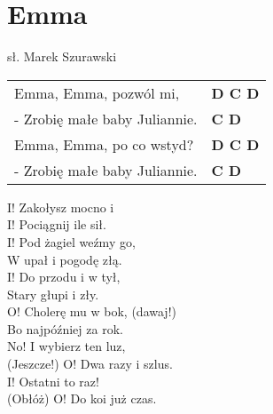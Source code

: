 \section{Emma}

sł. Marek Szurawski

\vspace{2em}
\begin{tabular}{@{}p{7cm}@{}l@{}}
Emma, Emma, pozwól mi, & \bfseries D C D\\
- Zrobię małe baby Juliannie. & \bfseries C D\\
Emma, Emma, po co wstyd? & \bfseries D C D\\
- Zrobię małe baby Juliannie. & \bfseries C D\\
\end{tabular}

\vspace{1em}
I! Zakołysz mocno i \\
I! Pociągnij ile sił. \\

I! Pod żagiel weźmy go, \\
W upał i pogodę złą. \\

I! Do przodu i w tył, \\
Stary głupi i zły. \\

O! Cholerę mu w bok, (dawaj!) \\
Bo najpóźniej za rok. \\

No! I wybierz ten luz, \\
(Jeszcze!) O! Dwa razy i szlus. \\

I! Ostatni to raz! \\
(Obłóż) O! Do koi już czas.